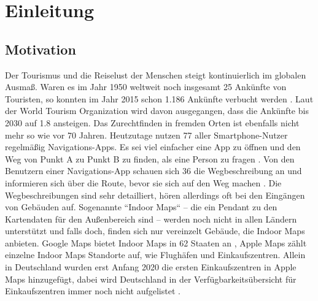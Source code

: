 \chapter{Einleitung}
\label{ch:introduction}

\section{Motivation}
Der Tourismus und die Reiselust der Menschen steigt kontinuierlich im globalen Ausmaß.
Waren es im Jahr 1950 weltweit noch insgesamt \SI{25}{\mio} Ankünfte von Touristen, so konnten im Jahr 2015 schon \SI{1.186}{\mrd} Ankünfte verbucht werden \parencite[1]{GLA2017}.
Laut der World Tourism Organization wird davon ausgegangen, dass die Ankünfte bis 2030 auf \SI{1.8}{\mrd} ansteigen.
Das Zurechtfinden in fremden Orten ist ebenfalls nicht mehr so wie vor 70 Jahren.
Heutzutage nutzen \SI{77}{\prc} aller Smartphone-Nutzer regelmäßig Navigations-Apps.
Es sei viel einfacher eine App zu öffnen und den Weg von Punkt A zu Punkt B zu finden, als eine Person zu fragen \parencite{PAN2018}.
Von den Benutzern einer Navigations-App schauen sich \SI{36}{\prc} die Wegbeschreibung an und informieren sich über die Route, bevor sie sich auf den Weg machen \parencite{PAN2018}.
Die Wegbeschreibungen sind sehr detailliert, hören allerdings oft bei den Eingängen von Gebäuden auf.
Sogenannte ``Indoor Maps`` – die ein Pendant zu den Kartendaten für den Außenbereich sind – werden noch nicht in allen Ländern unterstützt und falls doch, finden sich nur vereinzelt Gebäude, die Indoor Maps anbieten.
Google Maps bietet Indoor Maps in 62 Staaten an \parencite{GOO2020}, Apple Maps zählt einzelne Indoor Maps Standorte auf, wie Flughäfen und Einkaufszentren.
Allein in Deutschland wurden erst Anfang 2020 die ersten Einkaufszentren in Apple Maps hinzugefügt, dabei wird Deutschland in der Verfügbarkeitsübersicht für Einkaufszentren immer noch nicht aufgelistet \parencite{OES2020}.

